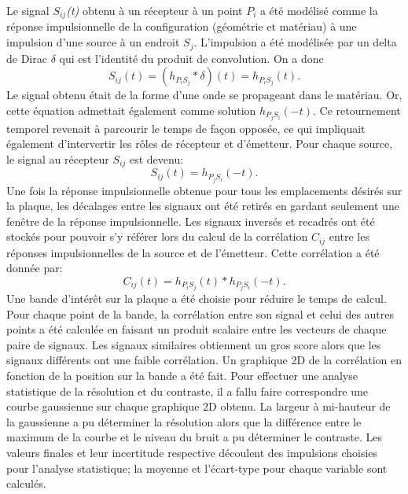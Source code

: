 \documentclass[conference]{IEEEtran}
\begin{document}
Le signal \textit{$S_{ij }$(t)} obtenu à un récepteur à un point \textit{$P_i$} a été
modélisé comme la réponse impulsionnelle de la configuration (géométrie et matériau) 
à une impulsion d'une source à un endroit \textit{$S_j$}. 
L'impulsion a été modélisée par un delta de Dirac \textit{$\delta$} qui est 
l'identité du produit de convolution. On a donc
%
\[S_{ij}(t)=(h_{P_iS_j} * \delta)(t)=h_{P_iS_j}(t).\]
%
Le signal obtenu était de la forme d'une onde se propageant dans le matériau. Or, 
cette équation admettait également comme solution $h_{P_jS_i}(-t)$. Ce retournement
temporel revenait à parcourir le temps de façon opposée, ce qui impliquait également 
d'intervertir les rôles de récepteur et d'émetteur. 
%
Pour chaque source, le signal au récepteur \textit{$S_{ij}$} est devenu:
\[S_{ij}(t)=h_{P_jS_i}(-t).\]
Une fois la réponse impulsionnelle obtenue pour tous les emplacements désirés 
sur la plaque, les décalages entre les signaux ont été retirés en gardant seulement 
une fenêtre de la réponse impulsionnelle.
Les signaux inversés et recadrés ont été stockés pour pouvoir s'y 
référer lors du calcul de la corrélation \textit{$C_{ij}$} entre les réponses impulsionnelles de la 
source et de l'émetteur. 
Cette corrélation a été donnée par:
\[C_{ij}(t)=h_{P_iS_j}(t)*h_{P_jS_i}(-t).\]
%
Une bande d'intérêt sur la plaque a été choisie pour réduire le temps de calcul. 
Pour chaque point de la bande, la corrélation entre son signal et celui 
des autres points a été calculée en faisant un produit scalaire entre les vecteurs 
de chaque paire de signaux. Les signaux similaires obtiennent un gros score alors que
les signaux différents ont une faible corrélation.
Un graphique 2D de la corrélation en fonction de la position sur la bande a été fait. 
Pour effectuer une analyse statistique de la résolution et du contraste, il a fallu 
faire correspondre une courbe gaussienne sur chaque graphique 2D obtenu. 
La largeur à mi-hauteur de la gaussienne a pu déterminer la résolution alors que la 
différence entre le maximum de la courbe et le niveau du bruit a pu déterminer le contraste.
Les valeurs finales et leur incertitude respective découlent des impulsions choisies 
pour l'analyse statistique; la moyenne et l'écart-type pour chaque variable sont calculés.
\end{document}
